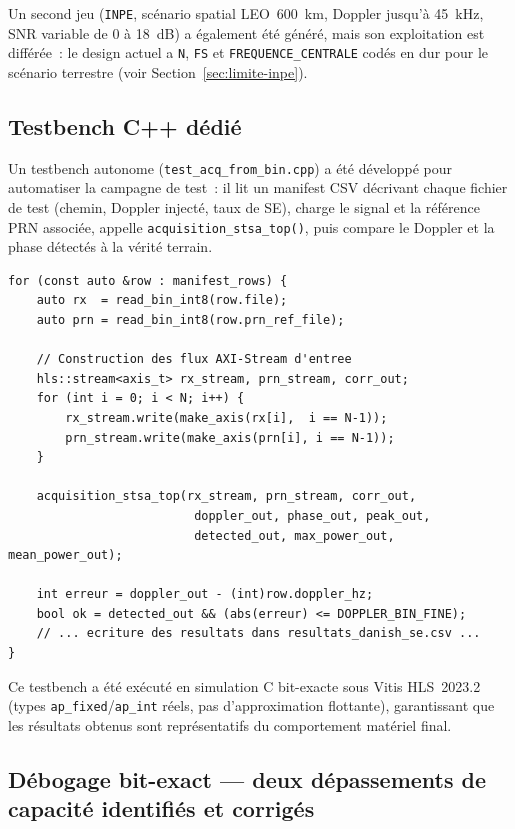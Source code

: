 \documentclass[11pt,a4paper]{article}
\begin{document}
Un second jeu (\texttt{INPE}, scénario spatial LEO~600~km, Doppler jusqu'à 45~kHz, SNR variable de 0 à 18~dB) a également été généré, mais son exploitation est différée~: le design actuel a \texttt{N}, \texttt{FS} et \texttt{FREQUENCE\_CENTRALE} codés en dur pour le scénario terrestre (voir Section~\ref{sec:limite-inpe}).

\subsection{Testbench C++ dédié}

Un testbench autonome (\texttt{test\_acq\_from\_bin.cpp}) a été développé pour automatiser la campagne de test~: il lit un manifest CSV décrivant chaque fichier de test (chemin, Doppler injecté, taux de SE), charge le signal et la référence PRN associée, appelle \texttt{acquisition\_stsa\_top()}, puis compare le Doppler et la phase détectés à la vérité terrain.

\begin{lstlisting}[caption={Structure simplifiée du testbench de campagne}]
for (const auto &row : manifest_rows) {
    auto rx  = read_bin_int8(row.file);
    auto prn = read_bin_int8(row.prn_ref_file);

    // Construction des flux AXI-Stream d'entree
    hls::stream<axis_t> rx_stream, prn_stream, corr_out;
    for (int i = 0; i < N; i++) {
        rx_stream.write(make_axis(rx[i],  i == N-1));
        prn_stream.write(make_axis(prn[i], i == N-1));
    }

    acquisition_stsa_top(rx_stream, prn_stream, corr_out,
                          doppler_out, phase_out, peak_out,
                          detected_out, max_power_out, mean_power_out);

    int erreur = doppler_out - (int)row.doppler_hz;
    bool ok = detected_out && (abs(erreur) <= DOPPLER_BIN_FINE);
    // ... ecriture des resultats dans resultats_danish_se.csv ...
}
\end{lstlisting}

Ce testbench a été exécuté en simulation C bit-exacte sous Vitis HLS~2023.2 (types \texttt{ap\_fixed}/\texttt{ap\_int} réels, pas d'approximation flottante), garantissant que les résultats obtenus sont représentatifs du comportement matériel final.

\subsection{Débogage bit-exact --- deux dépassements de capacité identifiés et corrigés}
\end{document}
